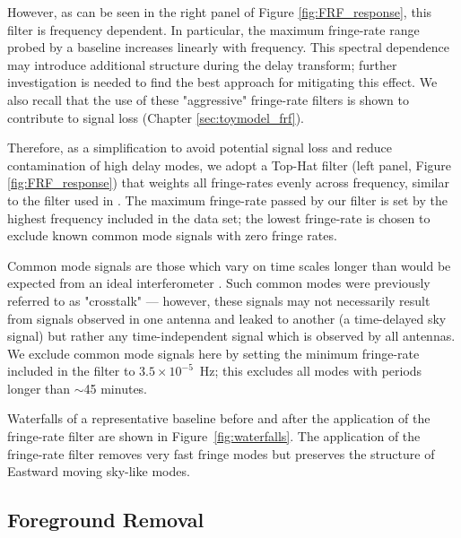 However, as can be seen in the right panel of Figure \ref{fig:FRF_response}, this filter is frequency dependent.
In particular, the maximum fringe-rate range probed by a baseline increases linearly with frequency.
This spectral dependence may introduce additional structure during the delay transform; further investigation is needed to find the best approach for mitigating this effect.
We also recall that the use of these "aggressive" fringe-rate filters is shown to contribute to signal loss
(Chapter \ref{sec:toymodel_frf}).

Therefore, as a simplification to avoid potential signal loss
and reduce contamination of high delay modes,
we adopt a Top-Hat filter (left panel, Figure \ref{fig:FRF_response})
that weights all fringe-rates evenly across frequency, similar to the filter used in \citet{parsons_et_al2012b}.
The maximum fringe-rate passed by our filter is set
by the highest frequency
included in the data set; the lowest fringe-rate is chosen to exclude known common mode signals with zero fringe
rates.

Common mode signals are those which vary on time scales longer than would be expected from an ideal interferometer \citep{ali_et_al2015}.
Such common modes were previously referred to as
	"crosstalk" --- however, these signals may not
	necessarily result from signals observed in one antenna and leaked to another
	(a time-delayed sky signal) but rather any time-independent signal which is observed by all antennas. We exclude common mode signals here by setting the minimum fringe-rate included in the filter to $3.5\times10^{-5}$~Hz; this
excludes all modes with periods longer than $\sim$45 minutes.


Waterfalls of a representative baseline
before and after the application of the
fringe-rate filter are shown in Figure~\ref{fig:waterfalls}.
The application of the fringe-rate filter removes very fast
fringe modes but preserves the structure of Eastward moving sky-like modes.

\subsection{Foreground Removal}\label{sec:wida}

